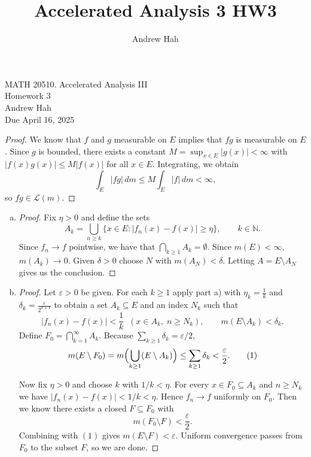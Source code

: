 \documentclass[11pt]{article}
\title{Accelerated Analysis 3 HW3}
\author{Andrew Hah}
\begin{document}
\pagestyle{plain}
\begin{center}
{\Large MATH 20510. Accelerated Analysis III} \\
{\Large Homework 3} \\
\vspace{.2in}  
Andrew Hah \\
Due April 16, 2025
\end{center}

\begin{exercise}{11.4}
    \begin{proof}
    We know that $f$ and $g$ measurable on $E$ implies that $fg$ is measurable on $E$. Since $g$ is bounded, there exists a constant $M=\sup_{x\in E}|g(x)|<\infty$ with $|f(x)g(x)|\le M|f(x)|$ for all $x\in E$.  Integrating, we obtain
    \[
      \int_E |fg|\,d m \le M\int_E |f|\,d m < \infty,
    \]
    so $fg \in \mathscr{L}(m)$.
    \end{proof}
\end{exercise}

\begin{exercise}{1}
    \begin{enumerate} [(a)]
        \item \begin{proof}
            Fix $\eta>0$ and define the sets
            \[
              A_k=\bigcup_{n\ge k}\{x\in E:|f_n(x)-f(x)|\ge\eta\}, \qquad k\in\mathbb N.
            \]
            Since $f_n \to f$ pointwise, we have that $\bigcap_{k\ge1}A_k=\emptyset$.  Since $m(E)<\infty$, $m(A_k)\to0$.  Given $\delta>0$ choose $N$ with $m(A_N)<\delta$. Letting $A=E\setminus A_N$ gives us the conclusion. 
            \end{proof}
            \item \begin{proof}
Let $\varepsilon>0$ be given.
For each $k\ge1$ apply part a) with $\eta_k =\frac{1}{k}$ and $\delta_k =\frac{\varepsilon}{2^{k+1}}$ to obtain a set $A_k\subseteq E$ and an index $N_k$ such that
\begin{equation*}
 |f_n(x)-f(x)|<\frac1k \;\;(x\in A_k,\;n\ge N_k), \qquad m(E\setminus A_k)<\delta_k.
\end{equation*}
Define
\(
  F_0 =\bigcap_{k=1}^{\infty}A_k.
\)
Because $\sum_{k\ge1}\delta_k=\varepsilon/2$, 
\[
 m(E\setminus F_0)=m\Bigl(\bigcup_{k\ge1}(E\setminus A_k)\Bigr)\le\sum_{k\ge1}\delta_k<\frac{\varepsilon}{2}. \tag{1}
\]

Now fix $\eta>0$ and choose $k$ with $1/k<\eta$.  For every $x\in F_0\subseteq A_k$ and $n\ge N_k$ we have $|f_n(x)-f(x)|<1/k<\eta$.  Hence $f_n\to f$ uniformly on $F_0$. Then we know there exists a closed $F\subseteq F_0$ with
\[
 m(F_0\setminus F)<\frac{\varepsilon}{2}.
\]
Combining with $(1)$ gives $m(E\setminus F)<\varepsilon$.  Uniform convergence passes from $F_0$ to the subset $F$, so we are done.
\end{proof}
    \end{enumerate}
\end{exercise}
\end{document}
